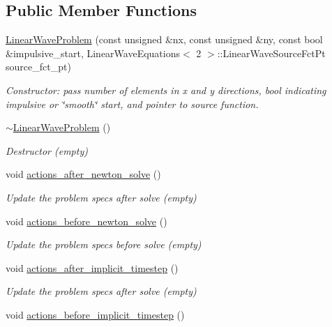 \subsection*{Public Member Functions}
\begin{DoxyCompactItemize}
\item 
\hyperlink{classLinearWaveProblem_a459a58b7afd588cfa78a5e1e98c3c41e}{Linear\+Wave\+Problem} (const unsigned \&nx, const unsigned \&ny, const bool \&impulsive\+\_\+start, Linear\+Wave\+Equations$<$ 2 $>$\+::Linear\+Wave\+Source\+Fct\+Pt source\+\_\+fct\+\_\+pt)
\begin{DoxyCompactList}\small\item\em Constructor\+: pass number of elements in x and y directions, bool indicating impulsive or \char`\"{}smooth\char`\"{} start, and pointer to source function. \end{DoxyCompactList}\item 
\hyperlink{classLinearWaveProblem_af1f3879114813b0acdfd2567c5c7b1e9}{$\sim$\+Linear\+Wave\+Problem} ()
\begin{DoxyCompactList}\small\item\em Destructor (empty) \end{DoxyCompactList}\item 
void \hyperlink{classLinearWaveProblem_a5b45c619af141b19162f990a95490e80}{actions\+\_\+after\+\_\+newton\+\_\+solve} ()
\begin{DoxyCompactList}\small\item\em Update the problem specs after solve (empty) \end{DoxyCompactList}\item 
void \hyperlink{classLinearWaveProblem_a66e87510f6fa8af693cede514cb7a62e}{actions\+\_\+before\+\_\+newton\+\_\+solve} ()
\begin{DoxyCompactList}\small\item\em Update the problem specs before solve (empty) \end{DoxyCompactList}\item 
void \hyperlink{classLinearWaveProblem_a521290f43f9aac37c9604e744fa71075}{actions\+\_\+after\+\_\+implicit\+\_\+timestep} ()
\begin{DoxyCompactList}\small\item\em Update the problem specs after solve (empty) \end{DoxyCompactList}\item 
void \hyperlink{classLinearWaveProblem_a39cfcb8ce06463ace1ac09fa43afa00a}{actions\+\_\+before\+\_\+implicit\+\_\+timestep} ()

\end{DoxyCompactItemize}
